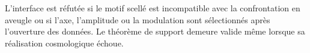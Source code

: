 \begin{criterion}
\label{crit:anisotropia-dodecafasica}
L'interface est réfutée si le motif scellé est incompatible avec la
confrontation en aveugle ou si l'axe, l'amplitude ou la modulation sont sélectionnés après
l'ouverture des données. Le théorème de support demeure valide même lorsque sa
réalisation cosmologique échoue.
\end{criterion}
